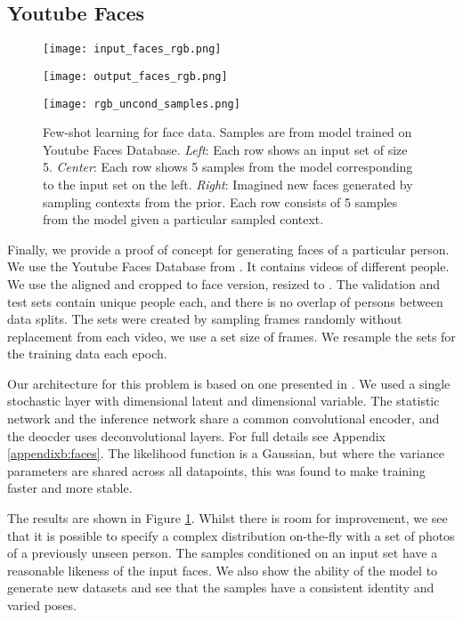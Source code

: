 \documentclass{article} \usepackage{iclr2017_conference,times}
\begin{document}
\subsection{Youtube Faces}

\begin{figure}[!hb]
\centering
\begin{minipage}{0.3\textwidth}
\texttt{[image: input\_faces\_rgb.png]}
\end{minipage}
\begin{minipage}{0.3\textwidth}
\texttt{[image: output\_faces\_rgb.png]}
\end{minipage}
\begin{minipage}{0.3\textwidth}
\texttt{[image: rgb\_uncond\_samples.png]}
\end{minipage}
\caption{Few-shot learning for face data. Samples are from model trained on Youtube Faces Database. \emph{Left}: Each row shows an input set of size 5. \emph{Center}: Each row shows 5 samples from the model corresponding to the input set on the left. \emph{Right}: Imagined new faces generated by sampling contexts from the prior. Each row consists of 5 samples from the model given a particular sampled context. \label{fig:table_faces}}
\end{figure}
Finally, we provide a proof of concept for generating faces of a particular person. We use the Youtube Faces Database from \citet{youtube_faces}. It contains  videos of  different people. We use the aligned and cropped to face version, resized to . The validation and test sets contain  unique people each, and there is no overlap of persons between data splits. The sets were created by sampling frames randomly without replacement from each video, we use a set size of  frames. We resample the sets for the training data each epoch.

Our architecture for this problem is based on one presented in \cite{discgen}. We used a single stochastic layer with  dimensional latent  and  dimensional  variable. The statistic network and the inference network  share a common convolutional encoder, and the deocder uses deconvolutional layers. For full details see Appendix \ref{appendixb:faces}. The likelihood function is a Gaussian, but where the variance parameters are shared across all datapoints, this was found to make training faster and more stable.

The results are shown in Figure \ref{fig:table_faces}. Whilst there is room for improvement, we see that it is possible to specify a complex distribution on-the-fly with a set of photos of a previously unseen person. The samples conditioned on an input set have a reasonable likeness of the input faces. We also show the ability of the model to generate new datasets and see that the samples have a consistent identity and varied poses. 
\vspace{-1em}
\end{document}
